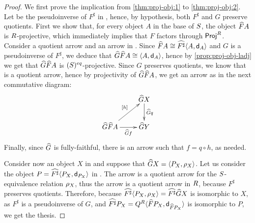 \begin{proof}
We first prove the implication from \cref{thm:proj-obj:1} to \cref{thm:proj-obj:2}. 
Let  be the pseudoinverse of $F^\sharp$ in \EQRDtn, 
hence, by hypothesis, both $F^\sharp$ and $G$ preserve quotients. 
% 
First we show that, for every object $A$ in the base of $S$, the object $\widehat{F}A$ is $R$-projective, which immediately implies that $F$ factors through $\mathsf{Proj}^{R}$. 
Consider a quotient arrow  and an arrow  in \CC.
Since $\widehat{F}A \cong \widehat{F^\sharp}{\langle A,\mathsf{d}_A \rangle }$ and $G$ is a pseudoinverse of $F^\sharp$, we deduce that 
$\widehat{G}\widehat{F}A \cong {\langle A,\mathsf{d}_A \rangle }$, hence by \cref{prop:proj-obj-ladj} we get that $\widehat{G}\widehat{F}A$ is $(S)^{eq}$-projective. 
Since $G$ preserves quotients, we know that 
 is a quotient arrow, hence by projectivity of $\widehat{G}\widehat{F}A$, we get an arrow
as in the next commutative diagram:
\[\xymatrix{
& \fn{G}X \ar[d]^-{\fn{G}q}  \\
  \fn{G}\fn{F}A \ar[r]_-{\fn{G}f} \ar[ur]^-{\eqc{h}} 
& \fn{G}Y 
}\]
Finally, since $\widehat{G}$ is fully-faithful, there is an arrow  such that 
$f = q\circ h$, as needed. 
 
Consider now an object $X$ in \CC  and suppose that $\widehat{G}X = {\langle P_X,\rho_X \rangle }$. 
Let us consider the object $P = \widehat{F^\sharp}{\langle P_X,\mathsf{d}_{P_X} \rangle }$ in \CC. 
The arrow   is a quotient arrow for the $S$-equivalence relation $\rho_X$,  
thus the arrow  is a quotient arrow in $R$, because $F^\sharp$ preserves quotients. 
Therefore, because $\widehat{F^\sharp}{\langle P_X,\rho_X \rangle } = \widehat{F^\sharp}\widehat{G} X$ is isomorphic to $X$, as $F^\sharp$ is a pseudoinverse of $G$, and $\widehat{F^\sharp}P_X = Q^R{\langle \widehat{F}P_X,\mathsf{d}_{\widehat{F}P_X} \rangle }$ is isomorphic to $P$, 
we get the thesis. 


\end{proof}
